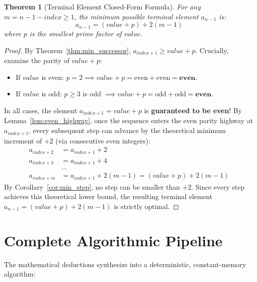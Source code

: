 \documentclass[10pt,journal,compsoc,onecolumn]{IEEEtran}
\newtheorem{theorem}{Theorem}
\begin{document}
\begin{theorem}[Terminal Element Closed-Form Formula]
\label{thm:terminal_formula}
For any $m = n - 1 - index \ge 1$, the minimum possible terminal element $a_{n-1}$ is:
\begin{equation}
a_{n-1} = (value + p) + 2(m - 1)
\end{equation}
where $p$ is the smallest prime factor of $value$.
\end{theorem}
\begin{proof}
By Theorem~\ref{thm:min_successor}, $a_{index+1} \ge value + p$. 
Crucially, examine the parity of $value + p$:
\begin{itemize}
    \item If $value$ is even: $p = 2 \implies value + p = \text{even} + \text{even} = \textbf{even}$.
    \item If $value$ is odd: $p \ge 3$ is odd $\implies value + p = \text{odd} + \text{odd} = \textbf{even}$.
\end{itemize}
In all cases, the element $a_{index+1} = value + p$ is \textbf{guaranteed to be even}!
By Lemma~\ref{lem:even_highway}, once the sequence enters the even parity highway at $a_{index+1}$, every subsequent step can advance by the theoretical minimum increment of $+2$ (via consecutive even integers):
\begin{align}
a_{index+2} &= a_{index+1} + 2 \\
a_{index+3} &= a_{index+1} + 4 \\
&\dots \\
a_{index+m} &= a_{index+1} + 2(m - 1) = (value + p) + 2(m - 1)
\end{align}
By Corollary~\ref{cor:min_step}, no step can be smaller than $+2$. Since every step achieves this theoretical lower bound, the resulting terminal element $a_{n-1} = (value + p) + 2(m - 1)$ is strictly optimal.
\end{proof}

\section{Complete Algorithmic Pipeline}
\label{sec:algorithm}

The mathematical deductions synthesize into a deterministic, constant-memory algorithm:
\end{document}
